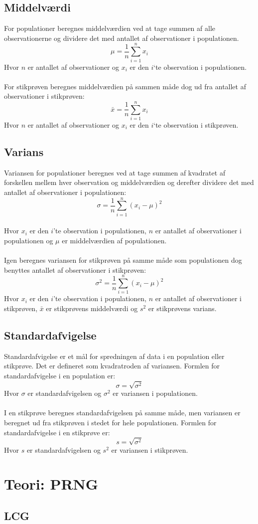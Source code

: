 \subsection{Middelværdi}
For populationer beregnes middelværdien  ved at tage summen af alle observationerne og dividere det med antallet af observationer i populationen.
\[\mu = \frac{1}{n} \sum_{i=1}^{n} x_i\]
Hvor $n$ er antallet af observationer og $x_i$ er den $i$`te observation i populationen.
\\
\\
For stikprøven beregnes middelværdien på sammen måde dog ud fra antallet af observationer i stikprøven:
\[\bar{x} = \frac{1}{n} \sum_{i=1}^{n} x_i\]
Hvor $n$ er antallet af observationer og $x_i$ er den $i$`te observation i stikprøven.

\subsection{Varians}
Variansen for populationer beregnes ved at tage summen af kvadratet af forskellen mellem hver observation og middelværdien og derefter dividere det med antallet af observationer i populationen:
\[\sigma = \frac{1}{n}\sum_{i=1}^{n}(x_i-\mu)^2\]
\\
Hvor $x_i$ er den $i$'te observation i populationen, $n$ er antallet af observationer i populationen og $\mu$ er middelværdien af populationen.
\\
\\
Igen beregnes variansen for stikprøven på samme måde som populationen dog benyttes antallet af observationer i stikprøven:
\[\sigma^2 = \frac{1}{n}\sum_{i=1}^{n}(x_i-\mu)^2\]
Hvor $x_i$ er den $i$'te observation i populationen, $n$ er antallet af observationer i stikprøven, $\bar{x}$ er stikprøvens middelværdi og $s^2$ er stikprøvens varians.

\subsection{Standardafvigelse}
Standardafvigelse er et mål for spredningen af data i en population eller stikprøve. Det er defineret som kvadratroden af variansen. Formlen for standardafvigelse i en population er:
\[\sigma = \sqrt{\sigma^2}\]
Hvor $\sigma$ er standardafvigelsen og $\sigma^2$ er variansen i populationen.
\\
\\
I en stikprøve beregnes standardafvigelsen på samme måde, men variansen er beregnet ud fra stikprøven i stedet for hele populationen. Formlen for standardafvigelse i en stikprøve er:
\[s = \sqrt{\sigma^2}\]
Hvor $s$ er standardafvigelsen og $s^2$ er variansen i stikprøven.


\section{Teori: PRNG}
\subsection{LCG}